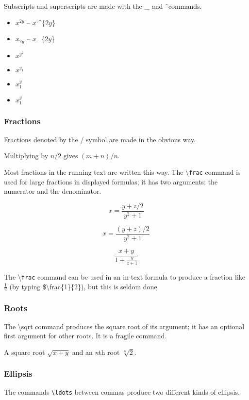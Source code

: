 \documentclass[twocolumn]{book}        %
\begin{document}
Subscripts and superscripts are made with the \_ and \^\ commands.

\begin{itemize}
    \item $x^{2y}$ -- $x$\char `^\{$2y$\}
    \item $x_{2y}$ -- $x$\_\{$2y$\}
    \item $x^{y^2}$
    \item $x^{y_1}$
    \item $x^{y}_{1}$
    \item $x_{1}^{y}$
\end{itemize}

\subsubsection*{Fractions}

Fractions denoted by the / symbol are made in the obvious way.

Multiplying by $n/2$ gives \( (m+n)/n \).

Most fractions in the running text are written this way. The \textbackslash{\tt frac} command 
is used for large fractions in displayed formulas; it has two arguments:
the numerator and the denominator.

\[ x = \frac{y+z/2}{y^{2}+1} \]

\[ x = \frac{(y+z)/2}{y^{2}+1} \]

\[ \frac{x+y}{1 + \frac{y}{z+1}} \]

The \textbackslash{\tt frac} command can be used in an in-text formula to produce a fraction like
$\frac{1}{2}$ (by typing \$\textbackslash{frac\{1\}\{2\}}), but this is seldom done.

\subsubsection*{Roots}

The \textbackslash sqrt command produces the square root of its argument; it has an optional first 
argument for other roots. It is a fragile command.

A square root $\sqrt{x+y}$ and an \emph{n}th root $\sqrt[n]{2}$.

\subsubsection{Ellipsis}

The commands \texttt{\textbackslash ldots} between commas produce two different kinds of ellipsis.
\end{document}
